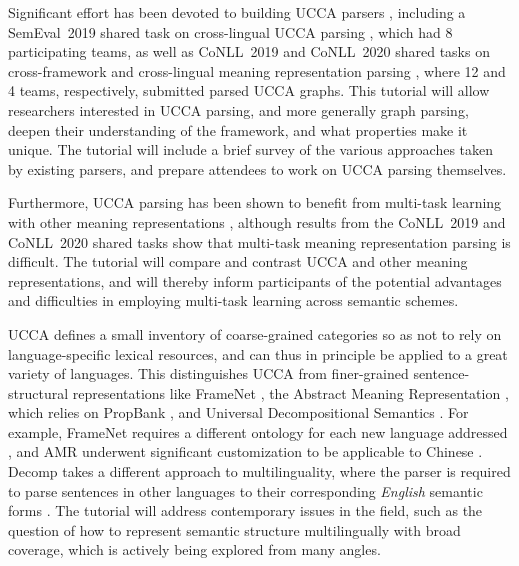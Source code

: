 \documentclass[11pt,table]{article}
\begin{document}
Significant effort has been devoted to building UCCA parsers
\cite{hershcovich2017a,hershcovich2018multitask,jiang-19,lyu-etal-2019-cuny,tuan-nguyen-tran-2019-dangnt,taslimipoor-etal-2019-gcn,marzinotto-etal-2019-maskparse,putz-glocker-2019-tupa,yu-sagae-2019-uc,zhang2019broad,Her:Arv:19,Li:Zha:Zha:19,Don:Fow:Gro:19,Che:Dou:Xu:19,Bai:Zha:19,Lai:Lo:Leu:19,Kor:Mor:Mor:19,Str:Str:19,Cao:Zha:Sri:19,Zha:Jia:Xia:19,Dro:Kut:Med:19,Che:Ye:Sun:19,Arv:Cui:Her:20,Sam:Str:20,Dou:Fen:Ji:20},
including a SemEval~2019 shared task
on cross-lingual UCCA parsing \cite{hershcovich2019shared},
which had 8 participating teams,
as well as CoNLL~2019 and CoNLL~2020 shared tasks on cross-framework and cross-lingual meaning representation
parsing \cite{Oep:Abe:Haj:19,Oep:Abe:Abz:20},
where 12 and 4 teams, respectively, submitted parsed UCCA graphs.
This tutorial will allow researchers interested in UCCA parsing, and more generally graph parsing, deepen their understanding of the framework, 
and what properties make it unique.
The tutorial will include a brief survey of the various approaches taken by existing parsers, and prepare attendees to work on UCCA parsing themselves.

Furthermore, UCCA parsing has been shown to benefit from multi-task learning
\cite{caruana1998multitask}
with other meaning representations \cite{hershcovich2018multitask}, although results from the CoNLL~2019 and CoNLL~2020 shared tasks \cite{Oep:Abe:Haj:19,Oep:Abe:Abz:20}
show that multi-task meaning representation parsing is difficult.
The tutorial will compare and contrast UCCA and other meaning representations,
and will thereby inform participants of the potential advantages and difficulties
in employing multi-task learning across semantic schemes.

UCCA defines a small inventory of coarse-grained categories so as not to rely on language-specific lexical resources, and  can thus in principle be applied to a great variety of languages. This distinguishes UCCA from finer-grained sentence-structural representations like FrameNet \cite{Baker:98}, the Abstract Meaning Representation \cite{banarescu2013abstract}, which relies on PropBank \cite{Palmer:05},
and Universal Decompositional Semantics \cite{white2016universal}.
For example, FrameNet requires a different ontology for each new language addressed \cite{ohara2003japanese,You2005BuildingCF,borin20132,park2014frame,hayoun-elhadad-2016-hebrew,djemaa-etal-2016-corpus},
and AMR underwent significant customization to be applicable to Chinese
\cite{li-etal-2016-annotating}. Decomp takes a different approach to multilinguality, where the parser is required to parse sentences in other languages to their corresponding {\it English} semantic forms \cite{zhang2018cross}.
The tutorial will address contemporary issues in the field, such as
the question of how to represent semantic structure multilingually with
broad coverage, which is actively being explored from many angles.
\end{document}
